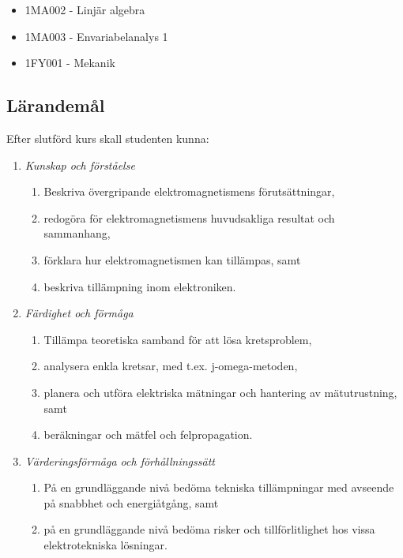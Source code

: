 \begin{itemize}
\tightlist
\item
  1MA002 - Linjär algebra
\item
  1MA003 - Envariabelanalys 1
\item
  1FY001 - Mekanik
\end{itemize}

\subsection*{Lärandemål}

Efter slutförd kurs skall studenten kunna:

\begin{enumerate}
\def\labelenumi{\Alph{enumi}.}
\tightlist
\item
  \emph{Kunskap och förståelse}

  \begin{enumerate}
  \def\labelenumii{\Alph{enumi}.\arabic{enumii}.}
  \tightlist
  \item
    Beskriva övergripande elektromagnetismens förutsättningar,
  \item
    redogöra för elektromagnetismens huvudsakliga resultat och
    sammanhang,
  \item
    förklara hur elektromagnetismen kan tillämpas, samt
  \item
    beskriva tillämpning inom elektroniken.
  \end{enumerate}
\item
  \emph{Färdighet och förmåga}

  \begin{enumerate}
  \def\labelenumii{\Alph{enumi}.\arabic{enumii}.}
  \tightlist
  \item
    Tillämpa teoretiska samband för att lösa kretsproblem,
  \item
    analysera enkla kretsar, med t.ex. j-omega-metoden,
  \item
    planera och utföra elektriska mätningar och hantering av
    mätutrustning, samt
  \item
    beräkningar och mätfel och felpropagation.
  \end{enumerate}
\item
  \emph{Värderingsförmåga och förhållningssätt}

  \begin{enumerate}
  \def\labelenumii{\Alph{enumi}.\arabic{enumii}.}
  \tightlist
  \item
    På en grundläggande nivå bedöma tekniska tillämpningar med avseende
    på snabbhet och energiåtgång, samt
  \item
    på en grundläggande nivå bedöma risker och tillförlitlighet hos
    vissa elektrotekniska lösningar.
  \end{enumerate}
\end{enumerate}

